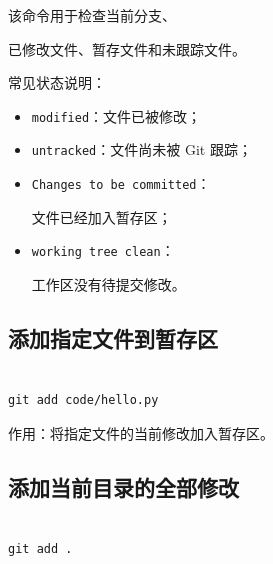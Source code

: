 该命令用于检查当前分支、

已修改文件、暂存文件和未跟踪文件。



常见状态说明：



\begin{itemize}

    \item \texttt{modified}：文件已被修改；

    \item \texttt{untracked}：文件尚未被 Git 跟踪；

    \item \texttt{Changes to be committed}：

          文件已经加入暂存区；

    \item \texttt{working tree clean}：

          工作区没有待提交修改。

\end{itemize}



\subsection{添加指定文件到暂存区}



\begin{lstlisting}

git add code/hello.py

\end{lstlisting}



作用：将指定文件的当前修改加入暂存区。







\subsection{添加当前目录的全部修改}



\begin{lstlisting}

git add .

\end{lstlisting}



